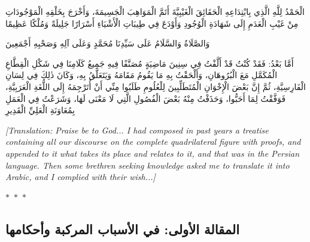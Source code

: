 \documentclass[11pt,a4paper]{article}
\theoremstyle{plain}
\theoremstyle{definition}
\theoremstyle{remark}
\newcommand{\ar}[1]{{\arabicfont\beginR #1\endR}}
\newcommand{\ornament}{\begin{center}\textcolor{goldaccent}{$\ast$~$\ast$~$\ast$}\end{center}}
\begin{document}
\ar{الْحَمْدُ لِلَّهِ الَّذِي بِابْتِدَاعِهِ الْحَقَائِقَ الْغَيْبِيَّةَ أَتَمَّ الْمَوَاهِبَ الْجَسِيمَةَ، وَأَخْرَجَ بِخَلْقِهِ الْمَوْجُودَاتِ مِنْ غَيْبِ الْعَدَمِ إِلَى شَهَادَةِ الْوُجُودِ وَأَوْدَعَ فِي طِيبَاتِ الْأَشْيَاءِ أَسْرَارًا جَلِيلَةً وَمُلْكًا عَظِيمًا



وَالصَّلَاةُ وَالسَّلَامُ عَلَى سَيِّدِنَا مُحَمَّدٍ وَعَلَى آلِهِ وَصَحْبِهِ أَجْمَعِينَ



أَمَّا بَعْدُ: فَقَدْ كُنْتُ قَدْ أَلَّفْتُ فِي سِنِينَ مَاضِيَةٍ مُصَنَّفًا فِيهِ جَمِيعُ كَلَامِنَا فِي شَكْلِ الْقِطَّاعِ الْمُكَمَّلِ مَعَ الْبُرُوهَانِ، وَأَلْحَقْتُ بِهِ مَا يَقُومُ مَقَامَهُ وَيَتَعَلَّقُ بِهِ، وَكَانَ ذٰلِكَ فِي لِسَانِ الْفَارِسِيَّةِ، ثُمَّ إِنَّ بَعْضَ الْإِخْوَانِ الْمُتَطَلِّبِينَ لِلْعُلُومِ طَلَبُوا مِنِّي أَنْ أُتَرْجِمَهُ إِلَى اللُّغَةِ الْعَرَبِيَّةِ، فَوَفَّقْتُ لِمَا أَحَبُّوا، وَحَذَفْتُ مِنْهُ بَعْضَ الْفُصُولِ الَّتِي لَا مَعْنَى لَهَا، وَشَرَعْتُ فِي الْعَمَلِ بِمُعَاوَنَةِ الْعَلِيِّ الْقَدِيرِ}



\vspace{0.5cm}

\noindent\textcolor{notecolor}{\textit{[Translation: Praise be to God... I had composed in past years a treatise containing all our discourse on the complete quadrilateral figure with proofs, and appended to it what takes its place and relates to it, and that was in the Persian language. Then some brethren seeking knowledge asked me to translate it into Arabic, and I complied with their wish...]}}



\ornament



\subsection*{\ar{المقالة الأولى: في الأسباب المركبة وأحكامها}}

\end{document}
